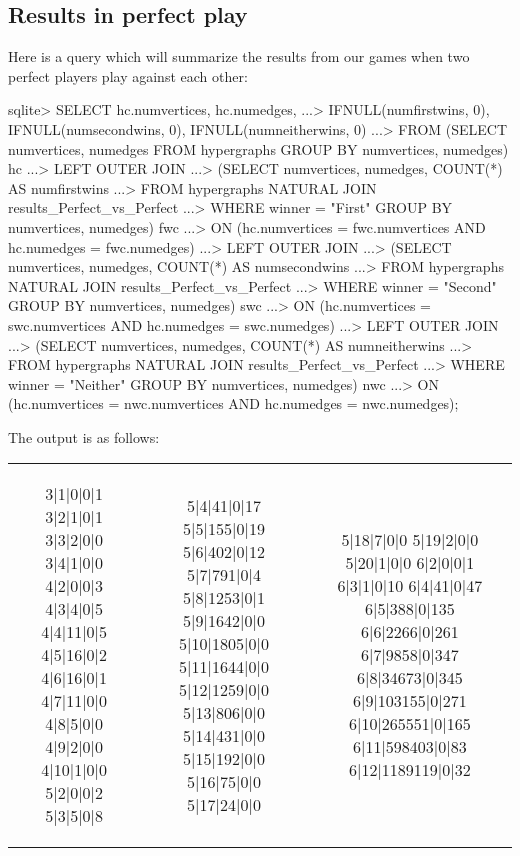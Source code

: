 \subsection{Results in perfect play}

Here is a query which will summarize the results from our games when two perfect players play against each other:

\begin{minipage}{\linewidth}
\begin{datalisting}
sqlite> SELECT hc.numvertices, hc.numedges,
   ...> IFNULL(numfirstwins, 0), IFNULL(numsecondwins, 0), IFNULL(numneitherwins, 0)
   ...> FROM (SELECT numvertices, numedges FROM hypergraphs GROUP BY numvertices, numedges) hc
   ...> LEFT OUTER JOIN
   ...> (SELECT numvertices, numedges, COUNT(*) AS numfirstwins
   ...> FROM hypergraphs NATURAL JOIN results_Perfect_vs_Perfect
   ...> WHERE winner = "First" GROUP BY numvertices, numedges) fwc
   ...> ON (hc.numvertices = fwc.numvertices AND hc.numedges = fwc.numedges)
   ...> LEFT OUTER JOIN
   ...> (SELECT numvertices, numedges, COUNT(*) AS numsecondwins
   ...> FROM hypergraphs NATURAL JOIN results_Perfect_vs_Perfect
   ...> WHERE winner = "Second" GROUP BY numvertices, numedges) swc
   ...> ON (hc.numvertices = swc.numvertices AND hc.numedges = swc.numedges)
   ...> LEFT OUTER JOIN
   ...> (SELECT numvertices, numedges, COUNT(*) AS numneitherwins
   ...> FROM hypergraphs NATURAL JOIN results_Perfect_vs_Perfect
   ...> WHERE winner = "Neither" GROUP BY numvertices, numedges) nwc
   ...> ON (hc.numvertices = nwc.numvertices AND hc.numedges = nwc.numedges);
\end{datalisting}
\end{minipage}
The output is as follows:

\begin{tabular}{c | c | c}
\begin{minipage}{1.0in}
\begin{datalisting}
3|1|0|0|1
3|2|1|0|1
3|3|2|0|0
3|4|1|0|0
4|2|0|0|3
4|3|4|0|5
4|4|11|0|5
4|5|16|0|2
4|6|16|0|1
4|7|11|0|0
4|8|5|0|0
4|9|2|0|0
4|10|1|0|0
5|2|0|0|2
5|3|5|0|8
\end{datalisting}
\end{minipage}
&
\begin{minipage}{1.0in}
\begin{datalisting}
5|4|41|0|17
5|5|155|0|19
5|6|402|0|12
5|7|791|0|4
5|8|1253|0|1
5|9|1642|0|0
5|10|1805|0|0
5|11|1644|0|0
5|12|1259|0|0
5|13|806|0|0
5|14|431|0|0
5|15|192|0|0
5|16|75|0|0
5|17|24|0|0
\end{datalisting}
\end{minipage}
&
\begin{minipage}{1.0in}
\begin{datalisting}
5|18|7|0|0
5|19|2|0|0
5|20|1|0|0
6|2|0|0|1
6|3|1|0|10
6|4|41|0|47
6|5|388|0|135
6|6|2266|0|261
6|7|9858|0|347
6|8|34673|0|345
6|9|103155|0|271
6|10|265551|0|165
6|11|598403|0|83
6|12|1189119|0|32
\end{datalisting}
\end{minipage}
\\
\end{tabular}

